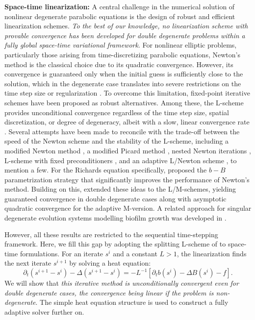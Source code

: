 \documentclass[review,11pt]{article}
\numberwithin{equation}{section}
\begin{document}
\textbf{Space-time linearization:} A central challenge in the numerical solution of nonlinear degenerate parabolic equations is the design of robust and efficient linearization schemes. \emph{To the best of our knowledge, no linearization scheme with provable convergence has been developed for double degenerate problems within a fully global space-time variational framework}. For nonlinear elliptic problems, particularly those arising from time-discretizing parabolic equations, Newton's method is the classical choice \cite{bergamaschi1999mixed,lehmann1998comparison} due to its quadratic convergence. However, its convergence is guaranteed only when the initial guess is sufficiently close to the solution, which in the degenerate case translates into severe restrictions on the time step size or regularization \cite{radu2006newton,javed2025robust,fevotte2024adaptive}. To overcome this limitation, fixed-point iterative schemes have been proposed as robust alternatives. Among these, the L-scheme provides unconditional convergence regardless of the time step size, spatial discretization, or degree of degeneracy, albeit with a slow, linear convergence rate \cite{pop2004mixed, list2016study}. Several attempts have been made to reconcile with the trade-off between the speed of the Newton scheme and the stability of the L-scheme, including a modified Newton method \cite{mitra2019modified}, a modified Picard method \cite{celia1990general}, nested Newton iterations \cite{casulli2010nested},  L-scheme with fixed preconditioners \cite{kohle2025robust}, and an adaptive L/Newton scheme \cite{stokke2023adaptive}, to mention a few. For the Richards equation specifically, 
\cite{brenner2017improving} proposed the $b-B$ parametrization strategy that significantly improves the performance of Newton's method. Building on this, \cite{javed2025robust} extended these ideas to the L/M-schemes, yielding guaranteed convergence in double degenerate cases along with asymptotic quadratic convergence for the adaptive M-version. A related approach for singular degenerate evolution systems modelling biofilm growth was developed in \cite{SmeetsEtAl2024}. 


However, all these results are restricted to the sequential time-stepping framework.  Here, we fill this gap by adopting the splitting L-scheme of \cite{javed2025robust} to space-time formulations. For an iterate $s^i$ and a constant $L>1$, the linearization finds the next iterate $s^{i+1}$ by solving a heat equation:
\begin{equation}\label{eq:Lsch-strong}
\partial_t(s^{i+1}-s^i) - \Delta(s^{i+1}- s^i) 
= -  L^{-1}[\partial_t b(s^i)-\Delta B(s^i) - f].
\end{equation}
We will show that \emph{this iterative method is unconditionally convergent even for double degenerate cases, the convergence being linear if the problem is non-degenerate}. The simple heat equation structure is used to construct a fully adaptive solver further on.
\end{document}
